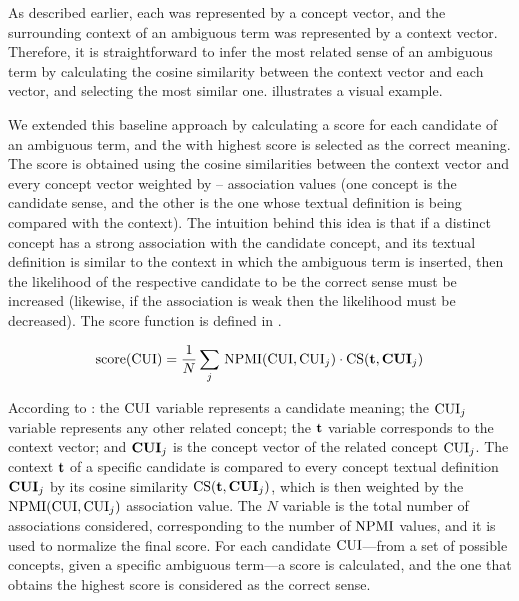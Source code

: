 As described earlier, each  was represented by a concept vector, and the surrounding context of an ambiguous term was represented by a context vector.
Therefore, it is straightforward to infer the most related sense of an ambiguous term by calculating the cosine similarity between the context vector and each  vector, and selecting the most similar one.  illustrates a visual example.



We extended this baseline approach by calculating a score for each candidate  of an ambiguous term, and the  with highest score is selected as the correct meaning.
The score is obtained using the cosine similarities between the context vector and every concept vector weighted by -- association values (one concept is the candidate sense, and the other is the one whose textual definition is being compared with the context).
The intuition behind this idea is that if a distinct concept has a strong association with the candidate concept, and its textual definition is similar to the context in which the ambiguous term is inserted, then the likelihood of the respective candidate  to be the correct sense must be increased (likewise, if the association is weak then the likelihood must be decreased).
The score function is defined in .

\begin{equation}
\label{eq:kb-score}
\operatorname{score}(\mathop{\mathrm{CUI}}\nolimits) = \frac{1}{N} \sum\limits_{j}{} \operatorname{NPMI}(\mathop{\mathrm{CUI}}\nolimits, \mathop{\mathrm{CUI}}\nolimits_j) \cdot \operatorname{CS}(\mathbf{t}, \mathop{\mathbf{CUI}}\nolimits_j)
\end{equation}

According to : the $\mathop{\mathrm{CUI}}\nolimits$ variable represents a candidate meaning; the $\mathop{\mathrm{CUI}}\nolimits_j$ variable represents any other related concept; the $\mathbf{t}$ variable corresponds to the context vector; and $\mathop{\mathbf{CUI}}\nolimits_j$ is the concept vector of the related concept $\mathop{\mathrm{CUI}}\nolimits_j$.
The context $\mathbf{t}$ of a specific candidate is compared to every concept textual definition $\mathop{\mathbf{CUI}}\nolimits_j$ by its cosine similarity $\operatorname{CS}(\mathbf{t}, \mathop{\mathbf{CUI}}\nolimits_j)$, which is then weighted by the $\operatorname{NPMI}(\mathop{\mathrm{CUI}}\nolimits, \mathop{\mathrm{CUI}}\nolimits_j)$ association value.
The $N$ variable is the total number of associations considered, corresponding to the number of $\operatorname{NPMI}$ values, and it is used to normalize the final score.
For each candidate $\mathop{\mathrm{CUI}}\nolimits$---from a set of possible concepts, given a specific ambiguous term---a score is calculated, and the one that obtains the highest score is considered as the correct sense.


